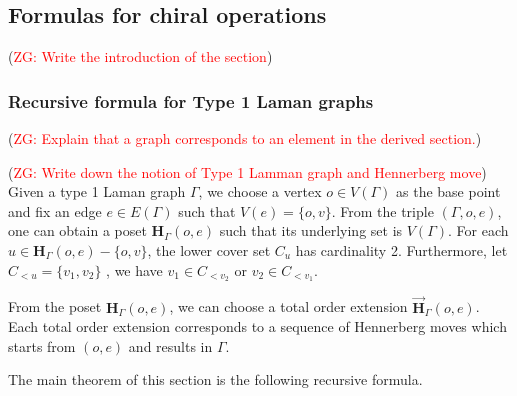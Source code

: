 \documentclass[11pt]{amsart}
\theoremstyle{definition}
\theoremstyle{remark}
\numberwithin{equation}{section}
\newcommand{\Gui}[1]{(\textcolor{red}{ZG: #1})}
\begin{document}
\subsection{Formulas for chiral operations}
\Gui{Write the introduction of the section}
\subsubsection{Recursive formula for Type 1 Laman graphs}
\Gui{Explain that a graph corresponds to an element in the derived section.}

\Gui{Write down the notion of Type 1 Lamman graph and Hennerberg move}
Given a type 1 Laman graph $\Gamma$, we choose a vertex $o\in V(\Gamma)$ as the base point and fix an edge $e\in E(\Gamma)$ such that $V(e)=\{o,v\}$. From the triple $(\Gamma,o,e)$, one can obtain a poset $\mathbf{H}_{\Gamma}(o,e)$ such that its underlying set is $V(\Gamma)$. For each $u\in \mathbf{H}_{\Gamma}(o,e)-\{o,v\}$, the lower cover set $C_u$ has cardinality 2. Furthermore, let $C_{<u}=\{v_1,v_2\}$ , we have $v_1\in C_{<v_2}$ or $v_2\in C_{<v_1}$.

From the poset $\mathbf{H}_{\Gamma}(o,e)$, we can choose a total order extension $\vec{\mathbf{H}}_{\Gamma}(o,e)$. Each total order extension corresponds to a sequence of Hennerberg moves which starts from $(o,e)$ and results in $\Gamma$.

The main theorem of this section is the following recursive formula.
\end{document}
